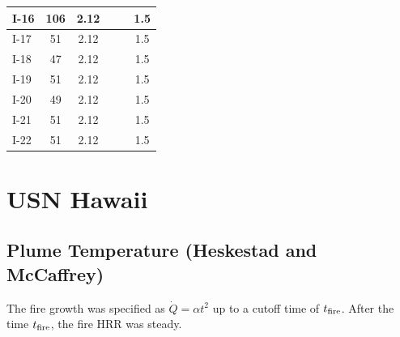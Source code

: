 \begin{table}[!ht]
\begin{center}
\begin{tabular}{|l|c|c||l|c|c|}
I-16       &  106                &  2.12      &            &                     &  1.5       \\ \hline
I-17       &  51                 &  2.12      &            &                     &  1.5       \\ \hline
I-18       &  47                 &  2.12      &            &                     &  1.5       \\ \hline
I-19       &  51                 &  2.12      &            &                     &  1.5       \\ \hline
I-20       &  49                 &  2.12      &            &                     &  1.5       \\ \hline
I-21       &  51                 &  2.12      &            &                     &  1.5       \\ \hline
I-22       &  51                 &  2.12      &            &                     &  1.5       \\ \hline
\end{tabular}
\end{center}
\end{table}


\clearpage


\section{USN Hawaii}

\subsection*{Plume Temperature (Heskestad and McCaffrey)~\cite{SFPE:Heskestad, McCaffrey:NBSIR_79-1910}}

The fire growth was specified as $\dot Q = \alpha t^2$ up to a cutoff time of $t_{\rm fire}$.
After the time $t_{\rm fire}$, the fire HRR was steady.

